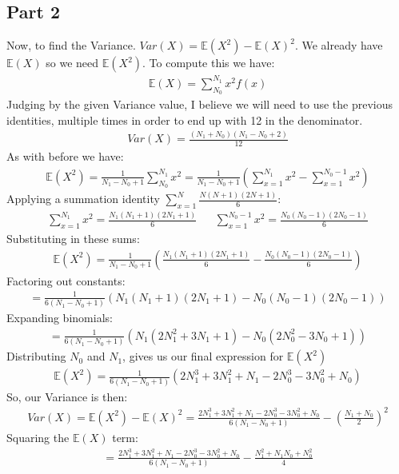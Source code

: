 \documentclass{article}
\begin{document}
\subsection*{Part 2}
Now, to find the Variance. $Var(X)=\mathbb{E}(X^2)-\mathbb{E}(X)^2$. We already have $\mathbb{E}(X)$ so we need $\mathbb{E}(X^2)$. To compute this we have:
\begin{align*}
\mathbb{E}(X) = \sum_{N_0}^{N_1} x^2 f(x)
\end{align*}
Judging by the given Variance value, I believe we will need to use the previous identities, multiple times in order to end up with 12 in the denominator.
\begin{align*}
Var(X) = \frac{(N_1+N_0)(N_1-N_0+2)}{12}
\end{align*}
As with before we have:
\begin{align*}
\mathbb{E}(X^2) = \frac{1}{N_1-N_0+1} \sum_{N_0}^{N_1} x^2 = \frac{1}{N_1-N_0+1}(\sum_{x=1}^{N_1} x^2 - \sum_{x=1}^{N_0-1} x^2)
\end{align*}
Applying a summation identity $\sum_{x=1}^{N}\frac{N(N+1)(2N+1)}{6}$:
\begin{align*}
\sum_{x=1}^{N_1} x^2 = \frac{N_1(N_1+1)(2N_1+1)}{6} && \sum_{x=1}^{N_0-1} x^2 = \frac{N_0(N_0-1)(2N_0-1)}{6}
\end{align*}
Substituting in these sums:
\begin{align*}
\mathbb{E}(X^2) = \frac{1}{N_1-N_0+1}(\frac{N_1(N_1+1)(2N_1+1)}{6} - \frac{N_0(N_0-1)(2N_0-1)}{6})
\end{align*}
Factoring out constants:
\begin{align*}
 = \frac{1}{6(N_1-N_0+1)}(N_1(N_1+1)(2N_1+1) - N_0(N_0-1)(2N_0-1))
\end{align*}
Expanding binomials:
\begin{align*}
 = \frac{1}{6(N_1-N_0+1)}(N_1(2N_1^2+3N_1+1) - N_0(2N_0^2-3N_0+1))
\end{align*}
Distributing $N_0$ and $N_1$, gives us our final expression for $\mathbb{E}(X^2)$
\begin{align*}
\boxed{ \mathbb{E}(X^2) = \frac{1}{6(N_1-N_0+1)}(2N_1^3+3N_1^2+N_1 - 2N_0^3-3N_0^2+N_0) }
\end{align*}
So, our Variance is then:
\begin{align*}
Var(X)=\mathbb{E}(X^2)-\mathbb{E}(X)^2 = \frac{2N_1^3+3N_1^2+N_1 - 2N_0^3-3N_0^2+N_0}{6(N_1-N_0+1)} - (\frac{N_1+N_0}{2})^2
\end{align*}
Squaring the $\mathbb{E}(X)$ term:
\begin{align*}
=\frac{2N_1^3+3N_1^2+N_1 - 2N_0^3-3N_0^2+N_0}{6(N_1-N_0+1)} - \frac{N_1^2+ N_1 N_0 + N_0^2}{4}
\end{align*}
\end{document}
